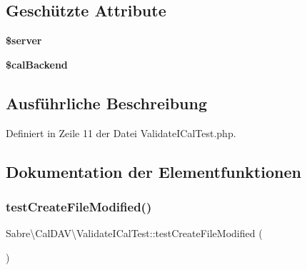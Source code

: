 \subsection*{Geschützte Attribute}
\begin{DoxyCompactItemize}
\item 
\mbox{\label{class_sabre_1_1_cal_d_a_v_1_1_validate_i_cal_test_ade83a7c258bccb028773fb7cc081acdd}} 
{\bfseries \$server}
\item 
\mbox{\label{class_sabre_1_1_cal_d_a_v_1_1_validate_i_cal_test_a747c11d5987ba791f7abe531d0c9ffdc}} 
{\bfseries \$cal\+Backend}
\end{DoxyCompactItemize}


\subsection{Ausführliche Beschreibung}


Definiert in Zeile 11 der Datei Validate\+I\+Cal\+Test.\+php.



\subsection{Dokumentation der Elementfunktionen}
\mbox{\label{class_sabre_1_1_cal_d_a_v_1_1_validate_i_cal_test_a41c4fd0378131c496e435df59723b693}} 
\subsubsection{\texorpdfstring{test\+Create\+File\+Modified()}{testCreateFileModified()}}
{\footnotesize\ttfamily Sabre\textbackslash{}\+Cal\+D\+A\+V\textbackslash{}\+Validate\+I\+Cal\+Test\+::test\+Create\+File\+Modified (\begin{DoxyParamCaption}{ }\end{DoxyParamCaption})}

